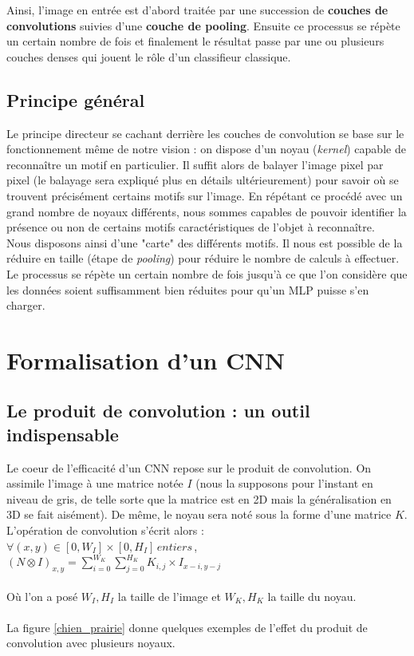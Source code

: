 Ainsi, l'image en entrée est d'abord traitée par une succession de \textbf{couches de convolutions} suivies d'une \textbf{couche de pooling}. Ensuite ce processus se répète un certain nombre de fois et finalement le résultat passe par une ou plusieurs couches denses qui jouent le rôle d'un classifieur classique.

\subsection{Principe général}
Le principe directeur se cachant derrière les couches de convolution se base sur le fonctionnement même de notre vision : on dispose d'un noyau (\textit{kernel}) capable de reconnaître un motif en particulier. Il suffit alors de balayer l'image pixel par pixel (le balayage sera expliqué plus en détails ultérieurement) pour savoir où se trouvent précisément certains motifs sur l'image. En répétant ce procédé avec un grand nombre de noyaux différents, nous sommes capables de pouvoir identifier la présence ou non de certains motifs caractéristiques de l'objet à reconnaître. \\
Nous disposons ainsi d'une "carte" des différents motifs. Il nous est possible de la réduire en taille (étape de \textit{pooling}) pour réduire le nombre de calculs à effectuer. 
Le processus se répète un certain nombre de fois jusqu'à ce que l'on considère que les données soient suffisamment bien réduites pour qu'un MLP puisse s'en charger. 

\section{Formalisation d'un CNN}

\subsection{Le produit de convolution : un outil indispensable}

Le coeur de l'efficacité d'un CNN repose sur le produit de convolution. On assimile l'image à une matrice notée $I$ (nous la supposons pour l'instant en niveau de gris, de telle sorte que la matrice est en 2D mais la généralisation en 3D se fait aisément). De même, le noyau sera noté sous la forme d'une matrice $K$.
L'opération de convolution s'écrit alors : \\

$\forall (x,y) \in [0,W_I] \times [0,H_I] \, entiers \, $,  $(N \otimes I)_{x,y} = \sum_{i=0}^{W_K} \sum_{j=0}^{H_K} K_{i,j} \times I_{x-i,y-j}$ \\
\\
Où l'on a posé $W_I,H_I$ la taille de l'image et $W_K,H_K$ la taille du noyau. \\
\\
La figure \ref{chien_prairie} donne quelques exemples de l'effet du produit de convolution avec plusieurs noyaux.

